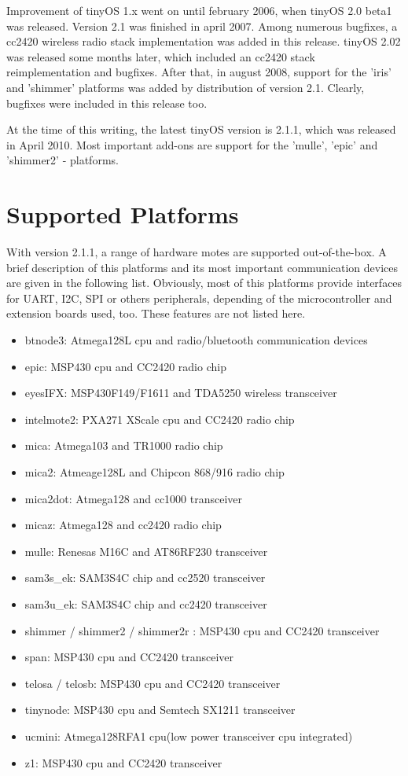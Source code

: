 Improvement of tinyOS 1.x went on until february 2006, when tinyOS 2.0 beta1 was released. Version 2.1 was finished in april 2007. Among numerous bugfixes, a cc2420 wireless radio stack implementation was added in this release. tinyOS 2.02 was released some months later, which included an cc2420 stack reimplementation and bugfixes.
After that, in august 2008, support for the 'iris' and 'shimmer' platforms was added by distribution of version 2.1. Clearly, bugfixes were included in this release too.

At the time of this writing, the latest tinyOS version is 2.1.1, which was released in April 2010. Most important add-ons are support for the 'mulle', 'epic' and 'shimmer2' - platforms. 

\section{Supported Platforms}

With version 2.1.1, a range of hardware motes are supported out-of-the-box. A brief description of this platforms and its most important communication devices are given in the following list. Obviously, most of this platforms provide interfaces for UART, I2C, SPI or others peripherals, depending of the microcontroller and extension boards used, too. These features are not listed here.

\begin{itemize}
 \item btnode3: Atmega128L cpu and radio/bluetooth communication devices
 \item epic: MSP430 cpu and CC2420 radio chip
 \item eyesIFX: MSP430F149/F1611 and TDA5250 wireless transceiver
 \item intelmote2: PXA271 XScale cpu and CC2420 radio chip 
 \item mica: Atmega103 and TR1000 radio chip
 \item mica2: Atmeage128L and Chipcon 868/916 radio chip
 \item mica2dot: Atmega128 and cc1000 transceiver
 \item micaz: Atmega128 and cc2420 radio chip
 \item mulle: Renesas M16C and AT86RF230 transceiver
 \item sam3s\_ek: SAM3S4C chip and cc2520 transceiver
 \item sam3u\_ek: SAM3S4C chip and cc2420 transceiver
 \item shimmer / shimmer2 / shimmer2r : MSP430 cpu and CC2420 transceiver
 \item span: MSP430 cpu and CC2420 transceiver
 \item telosa / telosb: MSP430 cpu and CC2420 transceiver
 \item tinynode: MSP430 cpu and Semtech SX1211 transceiver
 \item ucmini: Atmega128RFA1 cpu(low power transceiver cpu integrated)
 \item z1: MSP430 cpu and CC2420 transceiver
\end{itemize}

